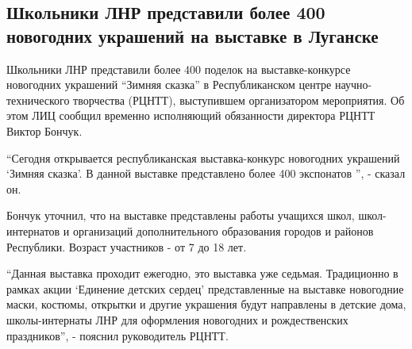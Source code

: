  
 
 
 
 
\subsection{Школьники ЛНР представили более 400 новогодних украшений на выставке в Луганске}
\label{sec:16_12_2021.stz.news.lnr.lug_info.1.shkolniki_novyj_god_ukrashenia}


Школьники ЛНР представили более 400 поделок на выставке-конкурсе новогодних
украшений \enquote{Зимняя сказка} в Республиканском центре научно-технического
творчества (РЦНТТ), выступившем организатором мероприятия. Об этом ЛИЦ сообщил
временно исполняющий обязанности директора РЦНТТ Виктор Бончук.


\enquote{Сегодня открывается республиканская выставка-конкурс новогодних
украшений \enquote{Зимняя сказка}. В данной выставке представлено более 400
экспонатов }, - сказал он.

Бончук уточнил, что на выставке представлены работы учащихся школ,
школ-интернатов и организаций дополнительного образования городов и районов
Республики. Возраст участников - от 7 до 18 лет.

\enquote{Данная выставка проходит ежегодно, это выставка уже седьмая. Традиционно в
рамках акции \enquote{Единение детских сердец} представленные на выставке новогодние
маски, костюмы, открытки и другие украшения будут направлены в детские дома,
школы-интернаты ЛНР для оформления новогодних и рождественских праздников}, -
пояснил руководитель РЦНТТ.



